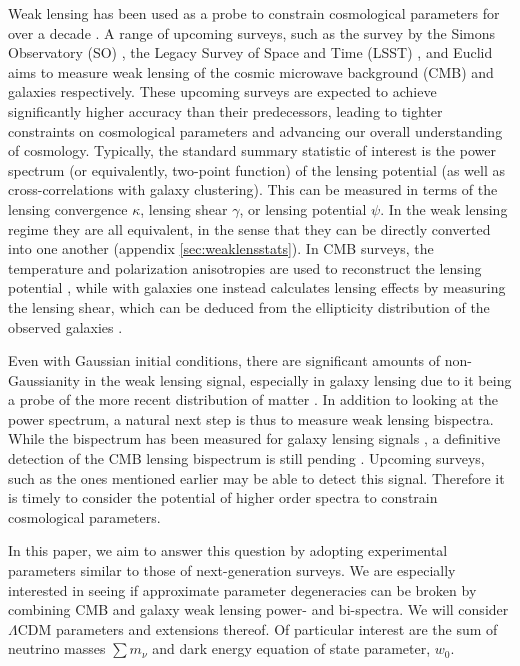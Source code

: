 \documentclass[11pt]{article} %
\begin{document}
Weak lensing has been used as a probe to constrain cosmological parameters for over a decade \cite{kilbinger2015cosmology,Bacon2000,Kaiser2000,Waerbeke2000,Bartelmann2001,Planck2018Lensing}. A range of upcoming surveys, such as the survey by the Simons Observatory (SO) \cite{Ade2019}, the Legacy Survey of Space and Time (LSST) \cite{Ivezic2019}, and Euclid \cite{Laureijs2011} aims to measure weak lensing of the cosmic microwave background (CMB) and galaxies respectively. These upcoming surveys are expected to achieve significantly higher accuracy than their predecessors, leading to tighter constraints on cosmological parameters and advancing our overall understanding of cosmology. Typically, the standard summary statistic of interest is the power spectrum (or equivalently, two-point function) of the lensing potential (as well as cross-correlations with galaxy clustering). This can be measured in terms of the lensing convergence $\kappa$, lensing shear $\gamma$, or lensing potential $\psi$. In the weak lensing regime they are all equivalent, in the sense that they can be directly converted into one another (appendix \ref{sec:weaklensstats}). In CMB surveys, the temperature and polarization anisotropies are used to reconstruct the lensing potential \cite{Hu_2002}, while with galaxies one instead calculates lensing effects by measuring the lensing shear, which can be deduced from the ellipticity distribution of the observed galaxies \cite{HoekstraJain2008}.

Even with Gaussian initial conditions, there are significant amounts of non-Gaussianity in the weak lensing signal, especially in galaxy lensing due to it being a probe of the more recent distribution of matter \cite{Bernardeau1997,Takada2003}. In addition to looking at the power spectrum, a natural next step is thus to measure weak lensing bispectra. While the bispectrum has been measured for galaxy lensing signals \cite{vanWaerbeke2002}, a definitive detection of the CMB lensing bispectrum is still pending \cite{Kalaja_2023,Namikawa_2016}. Upcoming surveys, such as the ones mentioned earlier may be able to detect this signal. Therefore it is timely to consider the potential of higher order spectra to constrain cosmological parameters. 

In this paper, we aim to answer this question by adopting experimental parameters similar to those of next-generation surveys. We are especially interested in seeing if approximate parameter degeneracies can be broken by combining CMB and galaxy weak lensing power- and bi-spectra. 
We will consider $\Lambda$CDM parameters and extensions thereof. Of particular interest are the sum of neutrino masses $\sum m_\nu$ and dark energy equation of state parameter, $w_0$. 
\end{document}
